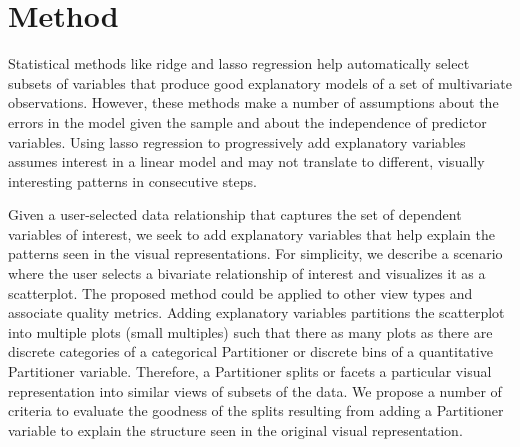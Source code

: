 \section{Method}
Statistical methods like ridge and lasso regression help automatically select subsets of variables that produce good explanatory models of a set of multivariate observations. However, these methods make a number of assumptions about the errors in the model given the sample and about the independence of predictor variables. Using lasso regression to progressively add explanatory variables assumes interest in a linear model and may not translate to different, visually interesting  patterns in consecutive steps. 

Given a user-selected data relationship that captures the set of dependent variables of interest, we seek to add explanatory variables that help explain the patterns seen in the visual representations. For simplicity, we describe a scenario where the user selects a bivariate relationship of interest and visualizes it as a scatterplot. The proposed method could be applied to other view types and associate quality metrics. Adding explanatory variables partitions the scatterplot into multiple plots (small multiples) such that there as many plots as there are discrete categories of a categorical Partitioner or discrete bins of a quantitative Partitioner variable. Therefore, a Partitioner splits or facets a particular visual representation into similar views of subsets of the data. We propose a number of criteria to evaluate the goodness of the splits resulting from adding a Partitioner variable to explain the structure seen in the original visual representation.

